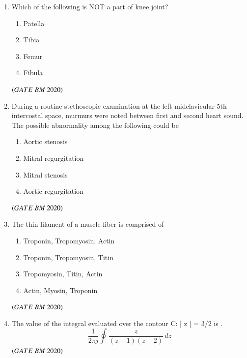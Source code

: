 \documentclass[journal,12pt,onecolumn]{IEEEtran}
\theoremstyle{remark}
\begin{document}
\begin{enumerate}
\item Which of the following is NOT a part of knee joint?
\begin{enumerate}[label=\alph*)] 
\item\hspace{0.5cm}Patella
\item\hspace{0.5cm}Tibia
\item\hspace{0.5cm}Femur
\item\hspace{0.5cm}Fibula
\end{enumerate}
 \hfill $\left(GATE\ BM\ 2020\right)$
 
\item During a routine stethoscopic examination at the left midclavicular-5th intercostal space, murmurs were noted between first and second heart sound. The possible abnormality among the following could be
\begin{enumerate}[label=\alph*)] 
\item\hspace{0.5cm}Aortic stenosis
\item\hspace{0.5cm}Mitral regurgitation
\item\hspace{0.5cm}Mitral stenosis
\item\hspace{0.5cm}Aortic regurgitation
\end{enumerate}
 \hfill $\left(GATE\ BM\ 2020\right)$
 
\item The thin filament of a muscle fiber is comprised of
\begin{enumerate}[label=\alph*)] 
\item\hspace{0.5cm}Troponin, Tropomyosin, Actin
\item\hspace{0.5cm}Troponin, Tropomyosin, Titin
\item\hspace{0.5cm}Tropomyosin, Titin, Actin
\item\hspace{0.5cm}Actin, Myosin, Troponin
\end{enumerate}
 \hfill $\left(GATE\ BM\ 2020\right)$
 
\item The value of the integral evaluated over the contour C: | z | = 3/2 is \underline{\hspace{2cm}}.\\
\[
\frac{1}{2\pi j} \oint_{ {}{}} \frac{z}{(z - 1)(z - 2)}\, dz
\]  \hfill $\left(GATE\ BM\ 2020\right)$


\end{enumerate}
\end{document}

